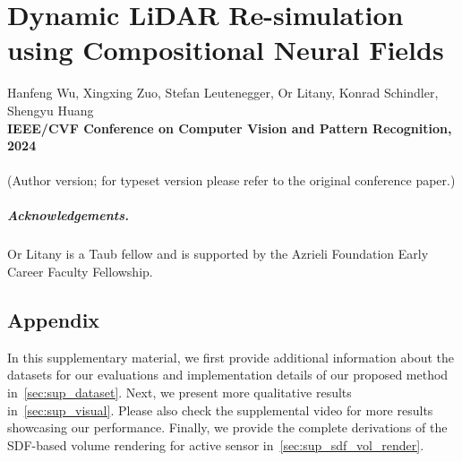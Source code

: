 \chapter[Dynamic LiDAR Re-simulation using Compositional Neural Fields]{Dynamic LiDAR Re-simulation using Compositional Neural Fields}
\label{chap:cvpr24}

Hanfeng Wu, Xingxing Zuo, Stefan Leutenegger, Or Litany, Konrad Schindler, Shengyu Huang \\
\textbf{IEEE/CVF Conference on Computer Vision and Pattern Recognition, 2024}\\
\\
(Author version; for typeset version please refer to the original conference paper.)\\

\providecommand{\subdir}{.}
\graphicspath{{\subdir/}}


\newpage









\paragraph{Acknowledgements.}
{Or Litany is a Taub fellow and is supported by the Azrieli Foundation Early Career Faculty Fellowship.}

\clearpage
\section{Appendix}
In this supplementary material, we first provide additional information about the datasets for our evaluations and implementation details of our proposed method in~\cref{sec:sup_dataset}. Next, we present more qualitative results in~\cref{sec:sup_visual}. Please also check the supplemental video for more results showcasing our performance. Finally, we provide the complete derivations of the SDF-based volume rendering for active sensor in~\cref{sec:sup_sdf_vol_render}. 



\clearpage
